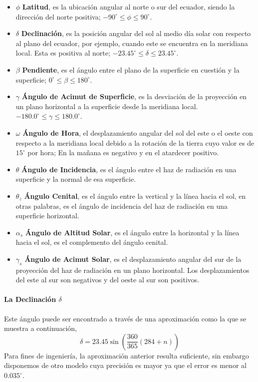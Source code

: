 \begin{itemize}
	\item $\phi$ \textbf{Latitud}, es la ubicación angular al norte o sur del ecuador, siendo la dirección del norte positiva; $-90^\circ\leq\phi\leq90^\circ$.
	\item $\delta$ \textbf{Declinación}, es la posición angular del sol al medio día solar con respecto al plano del ecuador, por ejemplo, cuando este se encuentra en la meridiana local. Esta es positiva al norte; $-23.45^\circ\leq\delta\leq23.45^\circ$.
	\item $\beta$ \textbf{Pendiente}, es el ángulo entre el plano de la superficie en cuestión y la superficie; $0^\circ\leq\beta\leq180^\circ$.
	\item $\gamma$ \textbf{Ángulo de Acimut de Superficie}, es la desviación de la proyección en un plano horizontal a la superficie desde la meridiana local. $-180.0^\circ\leq\gamma\leq180.0^\circ$.
	\item $\omega$ \textbf{Ángulo de Hora}, el desplazamiento angular del sol del este o el oeste con respecto a la meridiana local debido a la rotación de la tierra cuyo valor es de $15^\circ$ por hora; En la mañana es negativo y en el atardecer positivo.
	\item $\theta$ \textbf{Ángulo de Incidencia}, es el ángulo entre el haz de radiación en una superficie y la normal de esa superficie.
	\item $\theta_z$ \textbf{Ángulo Cenital}, es el ángulo entre la vertical y la línea hacia el sol, en otras palabras, es el ángulo de incidencia del haz de radiación en una superficie horizontal.
	\item $\alpha_s$ \textbf{Ángulo de Altitud Solar}, es el ángulo entre la horizontal y la línea hacia el sol, es el complemento del ángulo cenital.
	\item $\gamma_s$ \textbf{Ángulo de Acimut Solar}, es el desplazamiento angular del sur de la proyección del haz de radiación en un plano horizontal. Los desplazamientos del este al sur son negativos y del oeste al sur son positivos.	
\end{itemize}

\paragraph{La Declinación $\delta$}
Este ángulo puede ser encontrado a través de una aproximación como la que se muestra a continuación,
\begin{equation} \label{eq:declinacion_ingenieria}
\delta = 23.45 \sin\left( \frac{360}{365}\left( 284 + n\right) \right) 
\end{equation}
Para fines de ingeniería, la aproximación anterior resulta suficiente, sin embargo disponemos de otro modelo cuya precisión es mayor ya que el error es menor al $0.035^\circ$.

